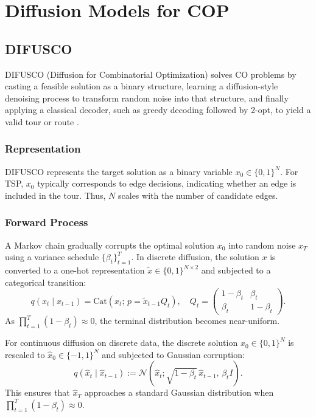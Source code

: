 \section{Diffusion Models for COP}
\label{sec:diffusion-cop}

\subsection{DIFUSCO}
\label{subsec:difusco}

DIFUSCO (Diffusion for Combinatorial Optimization) solves CO problems by casting a feasible
solution as a binary structure, learning a diffusion-style denoising process to transform
random noise into that structure, and finally applying a classical decoder, such as greedy
decoding followed by 2-opt, to yield a valid tour or route \citep{sun2023difusco}.

\subsubsection{Representation}
\label{subsec:difusco-representation}

DIFUSCO represents the target solution as a binary variable $x_0\in\{0,1\}^N$. For TSP,
$x_0$ typically corresponds to edge decisions, indicating whether an edge is included in the
tour. Thus, $N$ scales with the number of candidate edges.

\subsubsection{Forward Process}
\label{subsec:difusco-forward}

A Markov chain gradually corrupts the optimal solution $x_0$ into random noise $x_T$ using a
variance schedule $\{\beta_t\}_{t=1}^T$. In discrete diffusion, the solution $x$ is converted
to a one-hot representation $\tilde{x}\in\{0,1\}^{N\times 2}$ and subjected to a categorical
transition:
\[
q(x_t\mid x_{t-1}) = \mathrm{Cat}(x_t;\,p=\tilde{x}_{t-1}Q_t),\quad
Q_t=\begin{pmatrix}
1-\beta_t & \beta_t\\
\beta_t & 1-\beta_t
\end{pmatrix}.
\]
As $\prod_{t=1}^T(1-\beta_t)\approx 0$, the terminal distribution becomes near-uniform.

For continuous diffusion on discrete data, the discrete solution $x_0\in\{0,1\}^N$ is
rescaled to $\hat{x}_0\in\{-1,1\}^N$ and subjected to Gaussian corruption:
\[
q(\hat{x}_t\mid \hat{x}_{t-1})
:= \mathcal{N}(\hat{x}_t;\sqrt{1-\beta_t}\,\hat{x}_{t-1},\,\beta_t I).
\]
This ensures that $\hat{x}_T$ approaches a standard Gaussian distribution when
$\prod_{t=1}^T(1-\beta_t)\approx 0$.

